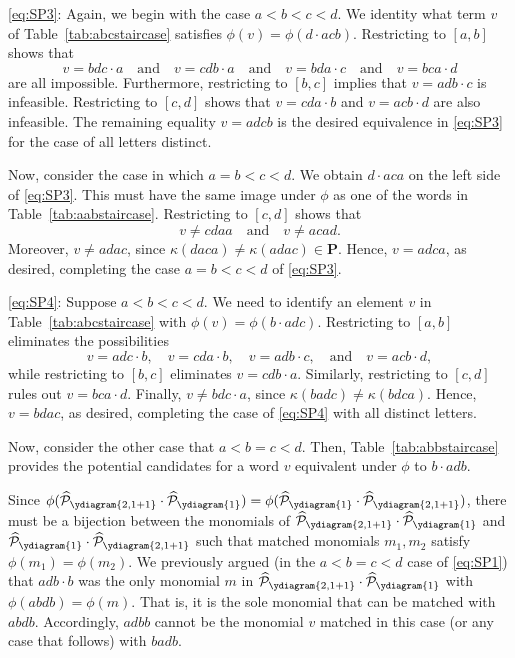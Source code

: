 \documentclass[12 pt]{amsart}
\newcommand{\Plactic}{{\mathbf{P}}}
\newcommand{\sFreeSchur}{\widehat{\mathcal{P}}}
\theoremstyle{remark}
\numberwithin{equation}{section}
\begin{document}
        \medbreak
   \eqref{eq:SP3}:
    Again, we begin with the case $a<b<c<d$. We identity what term $v$ of Table~\ref{tab:abcstaircase} satisfies $\phi(v)=\phi(d \cdot acb)$.
    Restricting to $[a,b]$ shows that 
    \[v= bdc\cdot a \quad \text{and} \quad v= cdb\cdot a \quad \text{and} \quad v= bda\cdot c \quad \text{and} \quad v= bca\cdot d\]
    are all impossible. 
    Furthermore, restricting to $[b,c]$ implies that $v= adb\cdot c$ is infeasible. Restricting to $[c,d]$ shows that $v=cda \cdot b$ and $v=acb\cdot d$ are also infeasible.
    The remaining equality $v=adcb$ is the desired equivalence in \eqref{eq:SP3} for the case of all letters distinct.

    Now, consider the case in which $a =b < c < d$.
    We obtain $d\cdot aca$ on the left side of \eqref{eq:SP3}. This must have the same image under $\phi$ as one of the words in Table~\ref{tab:aabstaircase}.
    Restricting to $[c,d]$ shows that  
    \[v \neq cdaa \quad \text{and} \quad v \neq aca  d.\]
    Moreover, $v \neq adac$, since $\kappa(daca) \neq \kappa(ada c) \in \Plactic$. Hence, $v = adca$, as desired, completing the case $a =b < c < d$ of \eqref{eq:SP3}.

        \medbreak
   \eqref{eq:SP4}:
    Suppose $a < b < c < d$. We need to identify an element $v$ in Table~\ref{tab:abcstaircase} with $\phi(v)=\phi(b\cdot adc)$.
    Restricting to $[a,b]$ eliminates the possibilities
    \[
    v=adc\cdot b, \quad v=cda\cdot b, \quad v=adb\cdot c, \quad \text{and} \quad v= acb\cdot d,
    \]
    while restricting to $[b,c]$ eliminates $v = cdb \cdot a$. Similarly, restricting to $[c,d]$ rules out $v= bca\cdot d$. Finally, $v\neq bdc\cdot a$, since $\kappa(badc)\neq \kappa(bdca)$. Hence, $v=bdac$, as desired, completing the case of \eqref{eq:SP4} with all distinct letters. 
    
    Now, consider the other case that $a < b=c < d$.
    Then, Table~\ref{tab:abbstaircase} provides the potential candidates for a word $v$ equivalent under $\phi$ to $b\cdot adb$. 
    
    Since $\phi(\sFreeSchur_{\ydiagram{2,1+1}} \cdot \sFreeSchur_{\ydiagram{1}}) = \phi(\sFreeSchur_{\ydiagram{1}}\cdot \sFreeSchur_{\ydiagram{2,1+1}})$, there must be a bijection between the monomials of $\sFreeSchur_{\ydiagram{2,1+1}} \cdot \sFreeSchur_{\ydiagram{1}}$ and $\sFreeSchur_{\ydiagram{1}}\cdot \sFreeSchur_{\ydiagram{2,1+1}}$ such that matched monomials $m_1, m_2$ satisfy $\phi(m_1) = \phi(m_2)$. We previously argued (in the $a<b=c<d$ case of \eqref{eq:SP1}) that $adb\cdot b$ was the only monomial $m$ in $\sFreeSchur_{\ydiagram{2,1+1}} \cdot \sFreeSchur_{\ydiagram{1}}$ with $\phi(abdb)=\phi(m)$. That is, it is the sole monomial that can be matched with $abdb$. Accordingly, $adbb$ cannot be the monomial $v$ matched in this case (or any case that follows) with $badb$.
    
\end{document}
